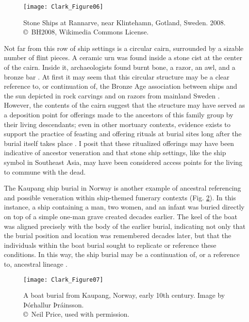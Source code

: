 \begin{figure}[!htb]
	\texttt{[image: Clark\_Figure06]}
	\caption{Stone Ships at Rannarve, near Klintehamn, Gotland, Sweden. 2008.
		{\normalfont\scriptsize \\ \copyright\ BH2008, Wikimedia Commons License.
	}}
	\label{fig:Clark_Figure06}
\end{figure}

Not far from this row of ship settings is a circular cairn, surrounded by a sizable number of flint pieces. A ceramic urn was found inside a stone cist at the center of the cairn. Inside it, archaeologists found burnt bone, a razor, an awl, and a bronze bar \parencite[7--26]{Gustavsson_2012}.
At first it may seem that this circular structure may be a clear reference to, or continuation of, the Bronze Age association between ships and the sun depicted in rock carvings and on razors from mainland Sweden \parencites{Kaul_1998}[400]{Skoglund_2008}.
However, the contents of the cairn suggest that the structure may have served as a deposition point for offerings made to the ancestors of this family group by their living descendants; even in other mortuary contexts, evidence exists to support the practice of feasting and offering rituals at burial sites long after the burial itself takes place \parencite[261]{Price_2008}. I posit that these ritualized offerings may have been indicative of ancestor veneration and that stone ship settings, like the ship symbol in Southeast Asia, may have been considered access points for the living to commune with the dead.

The Kaupang ship burial in Norway is another example of ancestral referencing and possible veneration within ship-themed funerary contexts (Fig. \ref{fig:Clark_Figure07}).
In this instance, a ship containing a man, two women, and an infant was buried directly on top of a simple one-man grave created decades earlier. The keel of the boat was aligned precisely with the body of the earlier burial, indicating not only that the burial position and location was remembered decades later, but that the individuals within the boat burial sought to replicate or reference these conditions. In this way, the ship burial may be a continuation of, or a reference to, ancestral lineage \parencites[267--268]{Price_2008}{Price_2012b}.

\begin{figure}[!htb]
	\texttt{[image: Clark\_Figure07]}
	\caption{A boat burial from Kaupang, Norway, early 10th century. Image by Þórhallur Þráinsson.
		{\normalfont\scriptsize \\ \copyright\ Neil Price, used with permission.
	}}
	\label{fig:Clark_Figure07}
\end{figure}

